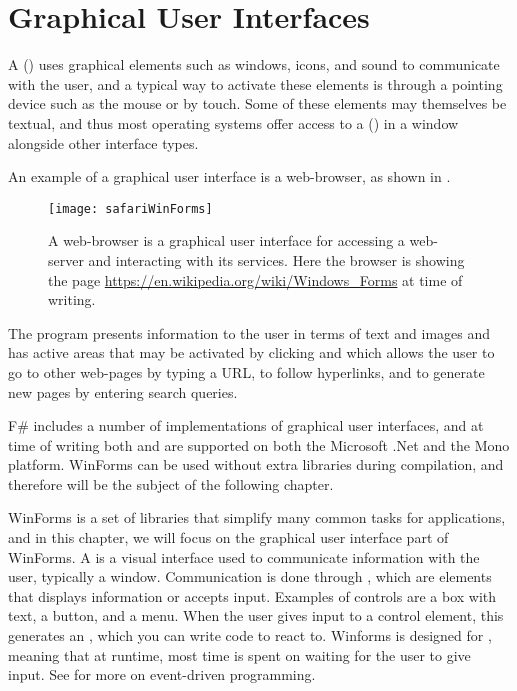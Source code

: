 \chapter{Graphical User Interfaces}
\label{chap:windows}

A  () uses graphical elements such as windows, icons, and sound to communicate with the user, and a typical way to activate these elements is through a pointing device such as the mouse or by touch. Some of these elements may themselves be textual, and thus most operating systems offer access to a  () in a window alongside other interface types.

An example of a graphical user interface is a web-browser, as shown in .
\begin{figure}
  \centering
  \texttt{[image: safariWinForms]}
  \caption{A web-browser is a graphical user interface for accessing a web-server and interacting with its services. Here the browser is showing the page \url{https://en.wikipedia.org/wiki/Windows_Forms} at time of writing.}
  \label{fig:safariGui}
\end{figure}
The program presents information to the user in terms of text and images and has active areas that may be activated by clicking and which allows the user to go to other web-pages by typing a URL, to follow hyperlinks, and to generate new pages by entering search queries.

F\# includes a number of implementations of graphical user interfaces, and at time of writing both  and  are supported on both the Microsoft .Net and the Mono platform. WinForms can be used without extra libraries during compilation, and therefore will be the subject of the following chapter.

WinForms is a set of libraries that simplify many common tasks for applications, and in this chapter, we will focus on the graphical user interface part of WinForms. A  is a visual interface used to communicate information with the user, typically a window. Communication is done through , which are elements that displays information or accepts input. Examples of controls are a box with text, a button, and a menu. When the user gives input to a control element, this generates an , which you can write code to react to. Winforms is designed for , meaning that at runtime, most time is spent on waiting for the user to give input. See  for more on event-driven programming.

